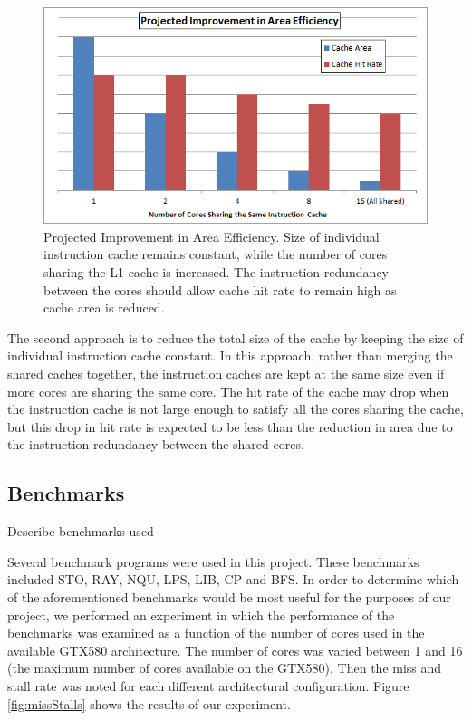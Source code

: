 \begin{figure}[b!]
\centering
\includegraphics[width=\columnwidth]{graphics/AreaEff.png}
\caption{Projected Improvement in Area Efficiency. Size of individual instruction cache remains constant, while the number of cores sharing the L1 cache is increased. The instruction redundancy between the cores should allow cache hit rate to remain high as cache area is reduced. }
\label{AreaEff}
\end{figure}


The second approach is to reduce the total size of the cache by
keeping the size of individual instruction cache constant. 
In this approach, rather than merging the shared caches together, the
instruction caches are kept at the same size even if more cores are
sharing the same core. 
The hit rate of the cache may drop when the instruction cache is not
large enough to satisfy all the cores sharing the cache, but this drop
in hit rate is expected to be less than the reduction in area due to
the instruction redundancy between the shared cores.


\subsection{Benchmarks}
Describe benchmarks used 

Several benchmark programs were used in this project. 
These benchmarks included STO, RAY, NQU, LPS, LIB, CP and BFS. 
In order to determine which of the aforementioned benchmarks would be
most useful for the purposes of our project, we performed an
experiment in which the performance of the benchmarks was examined as
a function of the number of cores used in the available GTX580
architecture. 
The number of cores was varied between 1 and 16 (the maximum number of
cores available on the GTX580). 
Then the miss and stall rate was noted for each different
architectural configuration. 
Figure \ref{fig:missStalls} shows the results of our experiment. 

